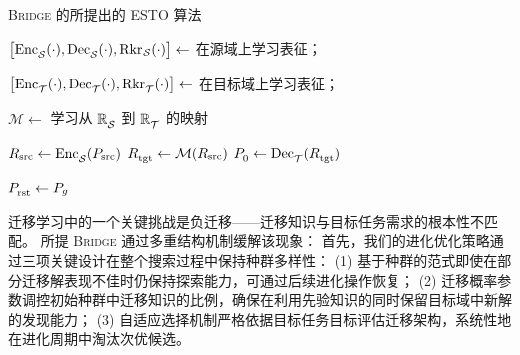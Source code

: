 \documentclass[../main.tex]{subfiles}
\begin{document}
\begin{algorithm}[t!]
	\SetAlgoLined{}
	\let\oldnl\nl %
	\newcommand{\nonl}{\renewcommand{\nl}{\let\nl\oldnl}}%
	\caption{\textsc{Bridge} 的所提出的 ESTO 算法}\label{algm:ch4-transfer}

	\BlankLine{}

	\( \big[\mathrm{Enc}^{\mathstrut}_{\mathcal{S}}(\cdot), \mathrm{Dec}^{\mathstrut}_{\mathcal{S}}(\cdot), \mathrm{Rkr^{\mathstrut}}_{\mathcal{S}}(\cdot)\big] \gets \) 在源域上学习表征；

	\( \big[\mathrm{Enc}^{\mathstrut}_{\mathcal{T}}(\cdot), \mathrm{Dec}^{\mathstrut}_{\mathcal{T}}(\cdot), \mathrm{Rkr}^{\mathstrut}_{\mathcal{T}}(\cdot)\big] \gets \) 在目标域上学习表征；

	\(\mathcal{M} \gets \) 学习从 \( \mathbb{R}^{\mathstrut}_{\mathcal{S}} \) 到 \( \mathbb{R}^{\mathstrut}_{\mathcal{T}} \) 的映射\;

	\BlankLine{}

	\( {R}^{\mathstrut}_\mathrm{src} \gets \mathrm{Enc}^{\mathstrut}_{\mathcal{S}} ({P}^{\mathstrut}_\mathrm{src}) \)\;
	\( {R}^{\mathstrut}_\mathrm{tgt} \gets \mathcal{M}({R}^{\mathstrut}_\mathrm{src}) \)\;
	\( {P}^{\mathstrut}_{0} \gets \mathrm{Dec}^{\mathstrut}_{\mathcal{T}}({R}^{\mathstrut}_\mathrm{tgt}) \)\;

	\BlankLine{}

	\( P^{\mathstrut}_\mathrm{rst} \gets P^{\mathstrut}_{g} \)\;

	\BlankLine{}

\end{algorithm}

迁移学习中的一个关键挑战是负迁移——迁移知识与目标任务需求的根本性不匹配。
所提 \textsc{Bridge} 通过多重结构机制缓解该现象：
首先，我们的进化优化策略通过三项关键设计在整个搜索过程中保持种群多样性：
(1) 基于种群的范式即使在部分迁移解表现不佳时仍保持探索能力，可通过后续进化操作恢复；
(2) 迁移概率参数调控初始种群中迁移知识的比例，确保在利用先验知识的同时保留目标域中新解的发现能力；
(3) 自适应选择机制严格依据目标任务目标评估迁移架构，系统性地在进化周期中淘汰次优候选。
\end{document}
